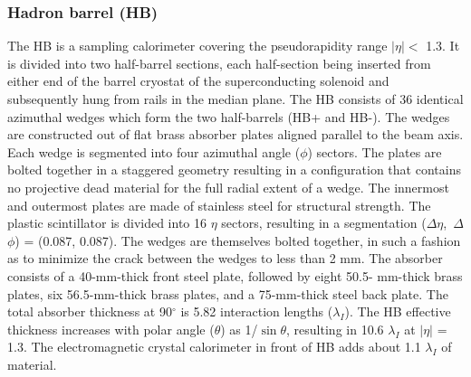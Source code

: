 \subsubsection{Hadron barrel (HB)}
The HB is a sampling calorimeter covering the pseudorapidity range $|\eta| <$ 1.3. It is divided into two half-barrel sections, each half-section being inserted from either end of the barrel cryostat of the superconducting solenoid and subsequently hung from rails in the median plane. The HB consists of 36 identical azimuthal wedges which form the two half-barrels (HB+ and HB-). The wedges are constructed out of flat brass absorber plates aligned parallel to the beam axis. Each wedge is segmented into four azimuthal angle ($\phi$) sectors. The plates are bolted together in a staggered geometry resulting in a configuration that contains no projective dead material for the full radial extent of a wedge. The innermost and outermost plates are made of stainless steel for structural strength. The plastic scintillator is divided into 16 $\eta$ sectors, resulting in a segmentation ($\Delta$$\eta$,\ $\Delta$$\phi$) = (0.087, 0.087). The wedges are themselves bolted together, in such a fashion as to minimize the crack between the wedges to less than 2 mm. The absorber consists of a 40-mm-thick front steel plate, followed by eight 50.5- mm-thick brass plates, six 56.5-mm-thick brass plates, and a 75-mm-thick steel back plate. The total absorber thickness at 90$^\circ$ is 5.82 interaction lengths ($\lambda_{I}$). The HB effective thickness increases with polar angle ($\theta$) as 1/$\sin \theta$, resulting in 10.6 $\lambda_{I}$ at $|\eta|$ = 1.3. The electromagnetic crystal calorimeter in front of HB adds about 1.1 $\lambda_{I}$ of material.

